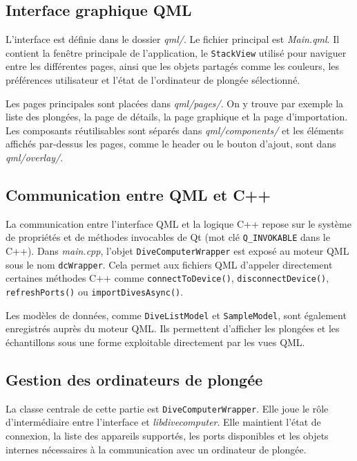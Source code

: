 \documentclass{article}
\begin{document}
\subsection{Interface graphique QML}

L'interface est définie dans le dossier \textit{qml/}. Le fichier principal est
\textit{Main.qml}. Il contient la fenêtre principale de l'application, le
\texttt{StackView} utilisé pour naviguer entre les différentes pages, ainsi que
les objets partagés comme les couleurs, les préférences utilisateur et l'état de
l'ordinateur de plongée sélectionné.

Les pages principales sont placées dans \textit{qml/pages/}. On y trouve par
exemple la liste des plongées, la page de détails, la page graphique et la page
d'importation. Les composants réutilisables sont séparés dans
\textit{qml/components/} et les éléments affichés par-dessus les pages, comme le
header ou le bouton d'ajout, sont dans \textit{qml/overlay/}.

\subsection{Communication entre QML et C++}
La communication entre l'interface QML et la logique C++ repose sur le système
de propriétés et de méthodes invocables de Qt (mot clé \texttt{Q\_INVOKABLE} dans le C++). Dans \textit{main.cpp}, l'objet
\texttt{DiveComputerWrapper} est exposé au moteur QML sous le nom
\texttt{dcWrapper}. Cela permet aux fichiers QML d'appeler directement certaines
méthodes C++ comme \texttt{connectToDevice()}, \texttt{disconnectDevice()},
\texttt{refreshPorts()} ou \texttt{importDivesAsync()}.

Les modèles de données, comme \texttt{DiveListModel} et \texttt{SampleModel},
sont également enregistrés auprès du moteur QML. Ils permettent d'afficher les
plongées et les échantillons sous une forme exploitable directement par les vues
QML.

\subsection{Gestion des ordinateurs de plongée}
La classe centrale de cette partie est \texttt{DiveComputerWrapper}. Elle joue
le rôle d'intermédiaire entre l'interface et \textit{libdivecomputer}. Elle
maintient l'état de connexion, la liste des appareils supportés, les ports
disponibles et les objets internes nécessaires à la communication avec un
ordinateur de plongée.
\end{document}
